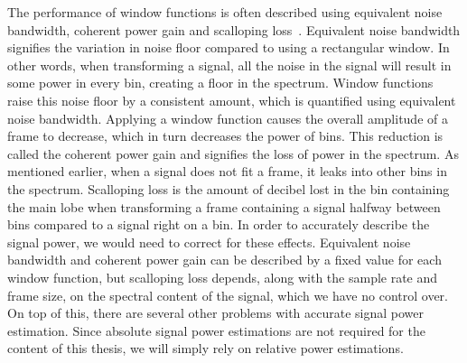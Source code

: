 \documentclass[10pt,twocolumn]{article}
\begin{document}
The performance of window functions is often described using equivalent noise bandwidth, coherent power gain and scalloping loss~\cite{windowperf3, windowperf2, windowperf}. Equivalent noise bandwidth signifies the variation in noise floor compared to using a rectangular window. In other words, when transforming a signal, all the noise in the signal will result in some power in every bin, creating a floor in the spectrum. Window functions raise this noise floor by a consistent amount, which is quantified using equivalent noise bandwidth.
%
Applying a window function causes the overall amplitude of a frame to decrease, which in turn decreases the power of bins. This reduction is called the coherent power gain and signifies the loss of power in the spectrum.
%
As mentioned earlier, when a signal does not fit a frame, it leaks into other bins in the spectrum. Scalloping loss is the amount of decibel lost in the bin containing the main lobe when transforming a frame containing a signal halfway between bins compared to a signal right on a bin.
%
In order to accurately describe the signal power, we would need to correct for these effects. Equivalent noise bandwidth and coherent power gain can be described by a fixed value for each window function, but scalloping loss depends, along with the sample rate and frame size, on the spectral content of the signal, which we have no control over. On top of this, there are several other problems with accurate signal power estimation. Since absolute signal power estimations are not required for the content of this thesis, we will simply rely on relative power estimations.
\end{document}
